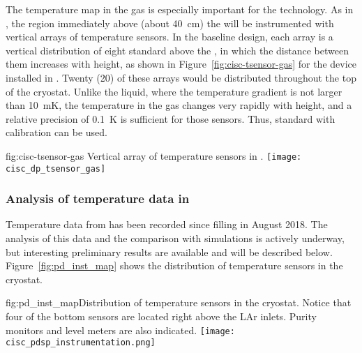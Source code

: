 The temperature map in the gas is especially important for the  technology. 
As in , the region immediately above (about \SI{40}{cm}) the  will be instrumented with vertical arrays of temperature sensors.  %
In the baseline design, each array is a vertical distribution of eight standard  above the , in which the distance between them increases with height, as shown in Figure~\ref{fig:cisc-tsensor-gas} for the device installed in .  Twenty (20) of these arrays would be distributed throughout the top of the cryostat. Unlike the liquid, where the temperature gradient is not larger than \SI{10}{mK}, the temperature in the gas changes very rapidly with height, and a relative precision of \SI{0.1}{K} is sufficient for those sensors. Thus, standard  with calibration can be used.    

\begin{dunefigure}{fig:cisc-tsensor-gas}
  {Vertical array of temperature sensors in .
  }
 \texttt{[image: cisc\_dp\_tsensor\_gas]}
\end{dunefigure}

\subsubsection{Analysis of temperature data in }
\label{sec:fdgen-slow-cryo-temp-ana}


Temperature data from  has been recorded since  filling %
in August 2018. The analysis of this data and the comparison with  simulations is actively underway, but interesting preliminary results are available and will be described below. Figure~\ref{fig:pd_inst_map} shows the distribution of temperature sensors in the  cryostat.  

\begin{dunefigure}{fig:pd_inst_map}{Distribution of temperature sensors in the  cryostat. Notice that four of the bottom sensors are located right above the LAr inlets. Purity monitors and level meters are also indicated. }
  \texttt{[image: cisc\_pdsp\_instrumentation.png]}%
\end{dunefigure}


